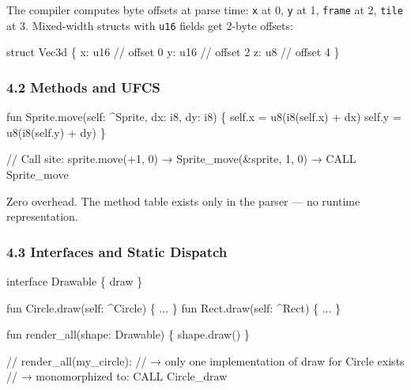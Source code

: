 \documentclass[
  11pt,
  a4paper,
]{report}
\newenvironment{Shaded}{\begin{snugshade}\small}{\end{snugshade}}
\newcommand{\NormalTok}[1]{#1}
\begin{document}
The compiler computes byte offsets at parse time: \texttt{x} at 0,
\texttt{y} at 1, \texttt{frame} at 2, \texttt{tile} at 3. Mixed-width
structs with \texttt{u16} fields get 2-byte offsets:

\begin{Shaded}
\begin{Highlighting}[]
\NormalTok{struct Vec3d \{}
\NormalTok{    x: u16   // offset 0}
\NormalTok{    y: u16   // offset 2}
\NormalTok{    z: u8    // offset 4}
\NormalTok{\}}
\end{Highlighting}
\end{Shaded}

\subsubsection{4.2 Methods and UFCS}\label{methods-and-ufcs}

\begin{Shaded}
\begin{Highlighting}[]
\NormalTok{fun Sprite.move(self: \^{}Sprite, dx: i8, dy: i8) \{}
\NormalTok{    self.x = u8(i8(self.x) + dx)}
\NormalTok{    self.y = u8(i8(self.y) + dy)}
\NormalTok{\}}

\NormalTok{// Call site:}
\NormalTok{sprite.move(+1, 0)   →   Sprite\_move(\&sprite, 1, 0)   →   CALL Sprite\_move}
\end{Highlighting}
\end{Shaded}

Zero overhead. The method table exists only in the parser --- no runtime
representation.

\subsubsection{4.3 Interfaces and Static
Dispatch}\label{interfaces-and-static-dispatch}

\begin{Shaded}
\begin{Highlighting}[]
\NormalTok{interface Drawable \{}
\NormalTok{    draw}
\NormalTok{\}}

\NormalTok{fun Circle.draw(self: \^{}Circle) \{ ... \}}
\NormalTok{fun Rect.draw(self: \^{}Rect) \{ ... \}}

\NormalTok{fun render\_all(shape: Drawable) \{}
\NormalTok{    shape.draw()}
\NormalTok{\}}

\NormalTok{// render\_all(my\_circle):}
\NormalTok{//   → only one implementation of \textquotesingle{}draw\textquotesingle{} for Circle exists}
\NormalTok{//   → monomorphized to: CALL Circle\_draw}
\end{Highlighting}
\end{Shaded}
\end{document}
